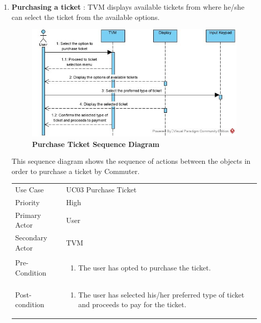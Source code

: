 \documentclass[15pt]{article}
\begin{document}
\begin{enumerate}[leftmargin=2em, itemsep=0pt, parsep=0pt, , font=\Large\bfseries]
\begin{tabularx}{1\textwidth} { 
  | >{\raggedright\arraybackslash}X 
  | >{\raggedright\arraybackslash}X 
  | }
\hline
\end{tabularx}



\newpage
\item {\Large\bfseries{Purchasing a ticket}} : TVM displays available tickets from where he/she can select the ticket from the available options.
\newline
\newline
\begin{figure}[H]
\centering
\includegraphics[width=\textwidth,height=\textheight,keepaspectratio]{Purchase_Ticket_seq.jpg}
\caption{\Large\bfseries{Purchase Ticket Sequence Diagram}}
\label{Purchase Ticket Sequence Diagram:do}
\end{figure}

This sequence diagram shows the sequence of actions between the objects in order to purchase a ticket by Commuter.

\begin{tabularx}{1\textwidth} { 
  | >{\raggedright\arraybackslash}X 
  | >{\raggedright\arraybackslash}X 
  | }
 \hline
 Use Case & UC03 Purchase Ticket \\
 Priority & High \\
 Primary Actor  & User \\
 Secondary Actor  & TVM \\

 Pre-Condition  & 
 \begin{enumerate}
  \item The user has opted to purchase the ticket.
  \end{enumerate}
  \\
  
   Post-condition  & \begin{enumerate}
  \item The user has selected his/her preferred type of ticket and proceeds to pay for the ticket.
  \end{enumerate}
  \\
  

\end{tabularx}
\end{enumerate}
\end{document}
